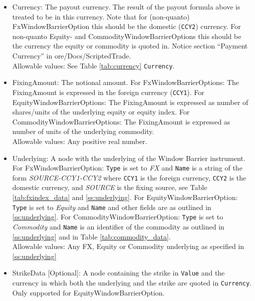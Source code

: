 \begin{itemize}

\item Currency: The payout currency. The result of the payout formula above is treated to be in this currency. Note that
  for (non-quanto) FxWindowBarrierOption this should be the domestic (\lstinline!CCY2!) currency. For non-quanto Equity-
  and CommodityWindowBarrierOptions this should be the currency the equity or commodity is quoted in.
  Notice section ``Payment Currency'' in ore/Docs/ScriptedTrade. \\

Allowable values: See Table \ref{tab:currency} \lstinline!Currency!.

\item FixingAmount: The notional amount. For FxWindowBarrierOptions: The FixingAmount is expressed in the foreign currency
  (\lstinline!CCY1!).  For EquityWindowBarrierOptions: The FixingAmount is expressed as number of shares/units of the underlying
  equity or equity index. For CommodityWindowBarrierOptions: The FixingAmount is expressed as number of units of the underlying
  commodity. \\

Allowable values: Any positive real number.

\item Underlying: A node with the underlying of the Window Barrier instrument. For FxWindowBarrierOption:
  \lstinline!Type! is set to \emph{FX} and \lstinline!Name! is a string of the form \emph{SOURCE-CCY1-CCY2} where
  \lstinline!CCY1! is the foreign currency, \lstinline!CCY2! is the domestic currency, and \emph{SOURCE} is the fixing
  source, see Table \ref{tab:fxindex_data} and \ref{ss:underlying}. For EquityWindowBarrierOption: \lstinline!Type! is
  set to \emph{Equity} and \lstinline!Name! and other fields are as outlined in \ref{ss:underlying}. For
  CommodityWindowBarrierOption: \lstinline!Type! is set to \emph{Commodity} and \lstinline!Name! is an identifier of the
  commodity as outlined in \ref{ss:underlying} and in Table \ref{tab:commodity_data}.\\

Allowable values: Any FX, Equity or Commodity underlying as specified in \ref{ss:underlying}

\item StrikeData [Optional]: A node containing the strike in \lstinline!Value! and the currency in which both the
  underlying and the strike are quoted in \lstinline!Currency!. Only supported for EquityWindowBarrierOption.\\


\end{itemize}
